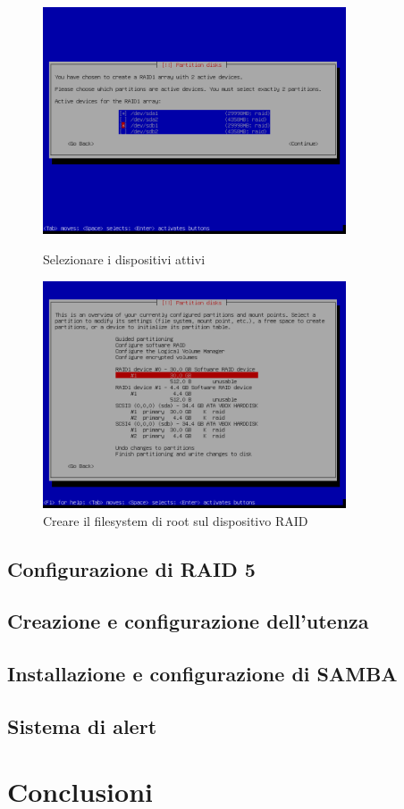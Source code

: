 \documentclass[11pt]{article}
\begin{document}
\begin{figure}[H]
    \includegraphics[width=0.8\textwidth, keepaspectratio]{../img/raid install/raid15.png}
    \centering
    \caption{Selezionare i dispositivi attivi}

    \includegraphics[width=0.8\textwidth, keepaspectratio]{../img/raid install/raid16.png}
    \centering
    \caption{Creare il filesystem di root sul dispositivo RAID}
\end{figure}

\subsection{Configurazione di RAID 5}
\subsection{Creazione e configurazione dell'utenza}
\subsection{Installazione e configurazione di SAMBA}
\subsection{Sistema di alert}



\section{Conclusioni}
\end{document}
